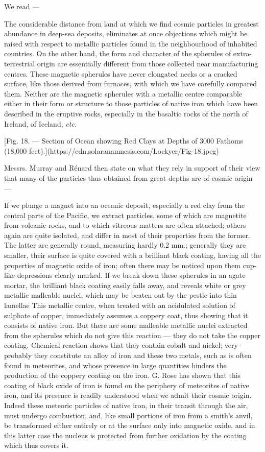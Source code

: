 \documentclass[a4paper, 12pt, oneside, polutonikogreek, english]{article}
\begin{document}
We read ---

The considerable distance from land at which we find cosmic particles in greatest abundance in deep-sea deposits, eliminates at once objections which might be raised with respect to metallic particles found in the neighbourhood of inhabited countries. On the other hand, the form and character of the spherules of extra-terrestrial origin are essentially different from those collected near manufacturing centres. These magnetic spherules have never elongated necks or a cracked surface, like those derived from furnaces, with which we have carefully compared them. Neither are the magnetic spherules with a metallic centre comparable either in their form or structure to those particles of native iron which have been described in the eruptive rocks, especially in the basaltic rocks of the north of Ireland, of Iceland, \emph{etc.}

[Fig. 18. --- Section of Ocean showing Red Clays at Depths of 3000 Fathoms (18,000 feet).](https://cdn.solaranamnesis.com/Lockyer/Fig-18.jpeg)

Messrs. Murray and Rénard then state on what they rely in support of their view that many of the particles thus obtained from great depths are of cosmic origin ---

If we plunge a magnet into an oceanic deposit, especially a red clay from the central parts of the Pacific, we extract particles, some of which are magnetite from volcanic rocks, and to which vitreous matters are often attached; others again are quite isolated, and differ in most of their properties from the former. The latter are generally round, measuring hardly 0.2 mm.; generally they are smaller, their surface is quite covered with a brilliant black coating, having all the properties of magnetic oxide of iron; often there may be noticed upon them cup-like depressions clearly marked. If we break down these spherules in an agate mortar, the brilliant black coating easily falls away, and reveals white or grey metallic malleable nuclei, which may be beaten out by the pestle into thin lamellae This metallic centre, when treated with an acidulated solution of sulphate of copper, immediately assumes a coppery coat, thus showing that it consists of native iron. But there are some malleable metallic nuclei extracted from the spherules which do not give this reaction --- they do not take the copper coating. Chemical reaction shows that they contain cobalt and nickel; very probably they constitute an alloy of iron and these two metals, such as is often found in meteorites, and whose presence in large quantities hinders the production of the coppery coating on the iron. G. Rose has shown that this coating of black oxide of iron is found on the periphery of meteorites of native iron, and its presence is readily understood when we admit their cosmic origin. Indeed these meteoric particles of native iron, in their transit through the air, must undergo combustion, and, like small portions of iron from a smith's anvil, be transformed either entirely or at the surface only into magnetic oxide, and in this latter case the nucleus is protected from further oxidation by the coating which thus covers it.
\end{document}
